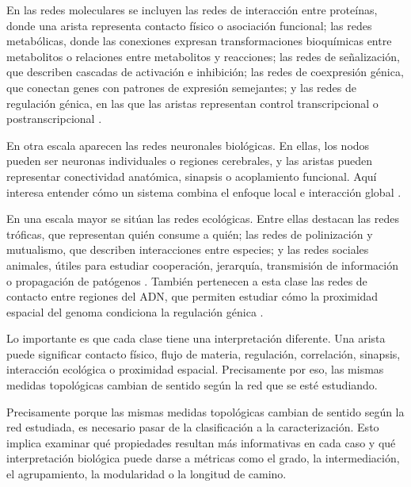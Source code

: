 \documentclass[11pt]{article}
\begin{document}
En las redes moleculares se incluyen las redes de interacción entre proteínas, donde una arista representa contacto físico o asociación funcional; las redes metabólicas, donde las conexiones expresan transformaciones bioquímicas entre metabolitos o relaciones entre metabolitos y reacciones; las redes de señalización, que describen cascadas de activación e inhibición; las redes de coexpresión génica, que conectan genes con patrones de expresión semejantes; y las redes de regulación génica, en las que las aristas representan control transcripcional o postranscripcional \parencite{Koutrouli2020,ZhangHorvath2005,EmmertStreib2014,BanfRhee2017}.

En otra escala aparecen las redes neuronales biológicas. En ellas, los nodos pueden ser neuronas individuales o regiones cerebrales, y las aristas pueden representar conectividad anatómica, sinapsis o acoplamiento funcional. Aquí interesa entender cómo un sistema combina el enfoque local e interacción global \parencite{BullmoreSporns2009}.

En una escala mayor se sitúan las redes ecológicas. Entre ellas destacan las redes tróficas, que representan quién consume a quién; las redes de polinización y mutualismo, que describen interacciones entre especies; y las redes sociales animales, útiles para estudiar cooperación, jerarquía, transmisión de información o propagación de patógenos \parencite{Bascompte2009,KrauseLusseauJames2009,Dunne2002}. También pertenecen a esta clase las redes de contacto entre regiones del ADN, que permiten estudiar cómo la proximidad espacial del genoma condiciona la regulación génica \parencite{Beagrie2017}.

Lo importante es que cada clase tiene una interpretación diferente. Una arista puede significar contacto físico, flujo de materia, regulación, correlación, sinapsis, interacción ecológica o proximidad espacial. Precisamente por eso, las mismas medidas topológicas cambian de sentido según la red que se esté estudiando.

Precisamente porque las mismas medidas topológicas cambian de sentido según la red estudiada, es necesario pasar de la clasificación a la caracterización. Esto implica examinar qué propiedades resultan más informativas en cada caso y qué interpretación biológica puede darse a métricas como el grado, la intermediación, el agrupamiento, la modularidad o la longitud de camino. 
\end{document}
